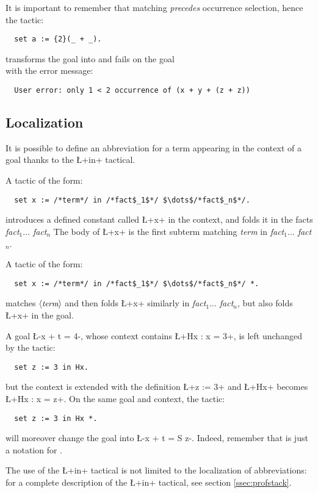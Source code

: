 It is important to remember that matching \emph{precedes} occurrence
selection, hence the tactic:
\begin{lstlisting}
  set a := {2}(_ + _).
\end{lstlisting}
transforms the goal  into 
and fails on the goal \\
 with the error message:
\begin{lstlisting}
  User error: only 1 < 2 occurrence of (x + y + (z + z))
\end{lstlisting}


\subsection{Localization}\label{ssec:loc}


It is possible to define an abbreviation for a term appearing in the
context of a goal thanks to the \L+in+ tactical.

A tactic of the form:
\begin{lstlisting}
  set x := /*term*/ in /*fact$_1$*/ $\dots$/*fact$_n$*/.
\end{lstlisting}
introduces a defined constant called \L+x+ in the context, and folds
it in the facts \textit{fact$_1 \dots$ fact$_n$}
The body of \L+x+ is the first subterm matching \textit{term} in
\textit{fact$_1 \dots$ fact$_n$}.

A tactic of the form:
\begin{lstlisting}
  set x := /*term*/ in /*fact$_1$*/ $\dots$/*fact$_n$*/ *.
\end{lstlisting}
matches $\langle\mbox{\itshape\rmfamily\small term}\rangle$ and then folds \L+x+ similarly in
\textit{fact$_1 \dots$ fact$_n$}, but also folds \L+x+ in the goal.

A goal \L-x + t = 4-, whose context contains \L+Hx : x = 3+, is left
unchanged by the tactic:
\begin{lstlisting}
  set z := 3 in Hx.
\end{lstlisting}
but the context is extended with the definition \L+z := 3+ and \L+Hx+ becomes
\L+Hx : x = z+.
On the same goal and context, the tactic:
\begin{lstlisting}
  set z := 3 in Hx *.
\end{lstlisting}
will moreover change the goal into \L-x + t = S z-. Indeed, remember
that  is just a notation for .

The use of the \L+in+ tactical is not limited to the localization of
abbreviations: for a complete description of the \L+in+ tactical, see
section \ref{ssec:profstack}.
